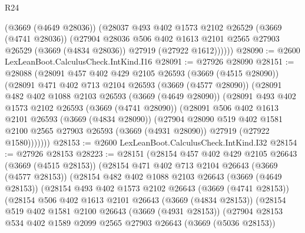\begin{lexlean}{R24}
\begin{coremodule}
          (@3669 (@4649 @28036))
          (@28037
            @493
            @402
            @1573
            @2102
            @26529
            (@3669 (@4741 @28036))
            (@27904
              @28036
              @506
              @402
              @1613
              @2101
              @2565
              @27903
              @26529
              (@3669 (@4834 @28036))
              @27919
              (@27922 @1612))))))
@28090 := @2600 LexLeanBoot.CalculusCheck.IntKind.I16
@28091 := @27926 @28090
@28151 := @28088
    (@28091
      @457
      @402
      @429
      @2105
      @26593
      (@3669 (@4515 @28090))
      (@28091
        @471
        @402
        @713
        @2104
        @26593
        (@3669 (@4577 @28090))
        (@28091
          @482
          @402
          @1088
          @2103
          @26593
          (@3669 (@4649 @28090))
          (@28091
            @493
            @402
            @1573
            @2102
            @26593
            (@3669 (@4741 @28090))
            (@28091
              @506
              @402
              @1613
              @2101
              @26593
              (@3669 (@4834 @28090))
              (@27904
                @28090
                @519
                @402
                @1581
                @2100
                @2565
                @27903
                @26593
                (@3669 (@4931 @28090))
                @27919
                (@27922 @1580)))))))
@28153 := @2600 LexLeanBoot.CalculusCheck.IntKind.I32
@28154 := @27926 @28153
@28223 := @28151
    (@28154
      @457
      @402
      @429
      @2105
      @26643
      (@3669 (@4515 @28153))
      (@28154
        @471
        @402
        @713
        @2104
        @26643
        (@3669 (@4577 @28153))
        (@28154
          @482
          @402
          @1088
          @2103
          @26643
          (@3669 (@4649 @28153))
          (@28154
            @493
            @402
            @1573
            @2102
            @26643
            (@3669 (@4741 @28153))
            (@28154
              @506
              @402
              @1613
              @2101
              @26643
              (@3669 (@4834 @28153))
              (@28154
                @519
                @402
                @1581
                @2100
                @26643
                (@3669 (@4931 @28153))
                (@27904
                  @28153
                  @534
                  @402
                  @1589
                  @2099
                  @2565
                  @27903
                  @26643
                  (@3669 (@5036 @28153))

\end{coremodule}
\end{lexlean}
